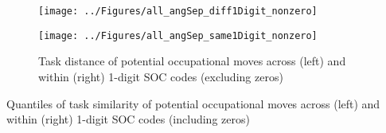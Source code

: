 \documentclass[11pt, oneside]{article}
\begin{document}
	\begin{figure}[H]
		\centering
		\begin{minipage}{.5\textwidth}
			\centering
			\texttt{[image: ../Figures/all\_angSep\_diff1Digit\_nonzero]}
		\end{minipage}%
		\begin{minipage}{.5\textwidth}
			\centering
			\texttt{[image: ../Figures/all\_angSep\_same1Digit\_nonzero]}
		\end{minipage}%
		\caption{Task distance of potential occupational moves across (left) and within (right) 1-digit SOC codes (excluding zeros)}
		\label{fig:angSep_diff}
	\end{figure}
	
	
	\begin{table}[H]
		\centering
		 
		\caption{Quantiles of task similarity of potential occupational moves across (left) and within (right) 1-digit SOC codes (including zeros)}
		\label{fig:angSep_quantile_diff_same}
	\end{table}
	
	
	
	
	
\end{document}
